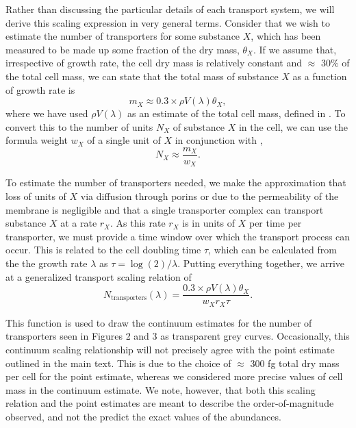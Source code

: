 Rather than discussing the particular details of each transport system, we will
derive this scaling expression in very general terms. Consider that we wish to
estimate the number of transporters for some substance $X$, which has been
measured to be made up some fraction of the dry mass, $\theta_X$. If we assume
that, irrespective of growth rate, the cell dry mass is relatively constant
\citep{basan2015} and $\approx$ 30\% of the total cell mass, we can state that
the total mass of substance $X$ as a function of growth rate is
\begin{equation}
m_X \approx 0.3 \times \rho V(\lambda) \theta_X,
\label{eq:m_x}
\end{equation}
where we have used $\rho V(\lambda)$ as an estimate of the total cell mass,
defined in . To convert this to the number of units $N_X$ of substance
$X$ in the cell, we can use the formula weight $w_X$ of a single unit of $X$ in
conjunction with ,
\begin{equation}
    N_X \approx \frac{m_X}{w_X}.
    \label{eq:n_x}
\end{equation}

To estimate the number of transporters needed, we make the approximation that
loss of units of $X$ via diffusion through porins or due to the permeability of
the membrane is negligible  and that a single transporter complex can transport
substance $X$ at a rate $r_X$. As this rate $r_X$  is in units of $X$ per time
per transporter, we must provide a time window over which the transport process
can occur. This is related to the cell doubling time $\tau$, which can be
calculated from the the growth rate $\lambda$ as $\tau = \log(2) / \lambda$.
Putting everything together, we arrive at a generalized transport scaling
relation of
\begin{equation}
N_\text{transporters}(\lambda) = \frac{0.3 \times \rho V(\lambda)\theta_X}{w_X r_X \tau}.
\label{eq:transporter_continuum}
\end{equation}

This function is used to draw the continuum estimates for the number of
transporters seen in Figures 2 and 3 as transparent grey curves. Occasionally,
this continuum scaling relationship will not precisely agree with the point
estimate outlined in the main text. This is due to the choice of $\approx$ 300 fg
total dry mass per cell for the point
estimate, whereas we considered more precise values of cell mass in the continuum estimate. We
note, however, that both this scaling relation and the point estimates are meant
to describe the order-of-magnitude observed, and not the predict the exact
values of the abundances.

